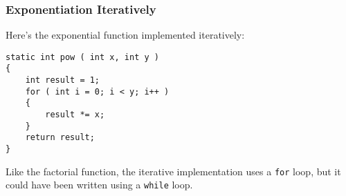 \begin{frame}[fragile]
\frametitle{Exponentiation Iteratively}
Here's the exponential function implemented iteratively:

\begin{verbatim}
static int pow ( int x, int y )
{
    int result = 1;
    for ( int i = 0; i < y; i++ )
    {
        result *= x;
    }
    return result;
}
\end{verbatim}

Like the factorial function, the iterative implementation uses a \texttt{for} loop, but it could have been written using a \texttt{while} loop.

\end{frame}



